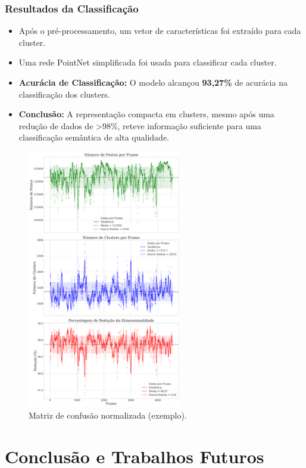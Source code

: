 \documentclass[aspectratio=169,t,xcolor=table]{beamer}
\begin{document}
\begin{frame}
    \frametitle{Resultados da Classificação}
    \begin{itemize}
        \item Após o pré-processamento, um vetor de características foi extraído para cada cluster.
        \item Uma rede PointNet simplificada foi usada para classificar cada cluster.
        \item \textbf{Acurácia de Classificação:} O modelo alcançou \textbf{93,27\%} de acurácia na classificação dos clusters.
        \item \textbf{Conclusão:} A representação compacta em clusters, mesmo após uma redução de dados de >98\%, reteve informação suficiente para uma classificação semântica de alta qualidade.
    \end{itemize}
    \begin{figure}
        \centering
        \includegraphics[width=0.6\textwidth]{figs/plot-1.png}
        \caption{Matriz de confusão normalizada (exemplo).}
    \end{figure}
\end{frame}

\section{Conclusão e Trabalhos Futuros}
\end{document}
